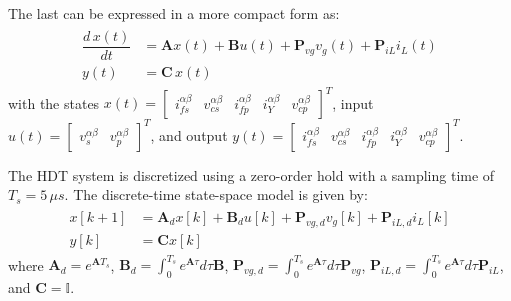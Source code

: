 The last can be expressed in a more compact form as:
\begin{align}
    \begin{aligned}
        \dfrac{d\, x(t)}{dt} &= \mathbf{A}x(t) + \mathbf{B}u(t) + \mathbf{P}_{vg}v_g(t) + \mathbf{P}_{iL}i_L(t)\\
        y(t) &= \mathbf{C}\,x(t)
    \end{aligned}
\end{align}
with the states $x(t) = \begin{bmatrix} i_{fs}^{\alpha\beta} & v_{cs}^{\alpha\beta} & i_{fp}^{\alpha\beta} & i_{Y}^{\alpha\beta} & v_{cp}^{\alpha\beta} \end{bmatrix}^T$, input $u(t) = \begin{bmatrix} v_s^{\alpha\beta} & v_p^{\alpha\beta} \end{bmatrix}^T$, and output \linebreak $y(t) = \begin{bmatrix} i_{fs}^{\alpha\beta} & v_{cs}^{\alpha\beta} & i_{fp}^{\alpha\beta} & i_{Y}^{\alpha\beta} & v_{cp}^{\alpha\beta} \end{bmatrix}^T$.

The HDT system is discretized using a zero-order hold with a sampling time of $T_s = 5\,\mu s$. The discrete-time state-space model is given by:
\begin{align}
    \begin{aligned}
        x[k+1] &= \mathbf{A}_d x[k] + \mathbf{B}_d u[k] + \mathbf{P}_{vg,d} v_g[k] + \mathbf{P}_{iL,d} i_L[k]\\
        y[k] &= \mathbf{C} x[k]
    \end{aligned}
\end{align}
where $\mathbf{A}_d = e^{\mathbf{A}T_s}$, $\mathbf{B}_d = \int_0^{T_s} e^{\mathbf{A}\tau} d\tau \mathbf{B}$, $\mathbf{P}_{vg,d} = \int_0^{T_s} e^{\mathbf{A}\tau} d\tau \mathbf{P}_{vg}$, $\mathbf{P}_{iL,d} = \int_0^{T_s} e^{\mathbf{A}\tau} d\tau \mathbf{P}_{iL}$, and $\mathbf{C} = \mathbb{I}$.

